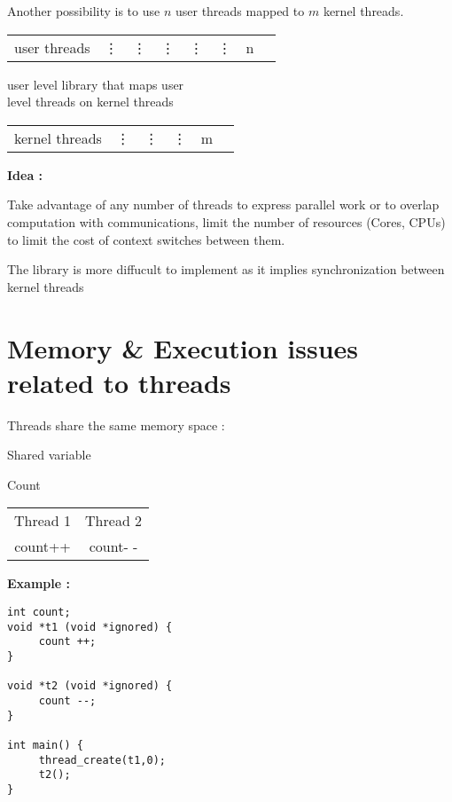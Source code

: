 \documentclass[a4paper,10pt]{article}
\begin{document}
Another possibility is to use $n$ user threads mapped to $m$ kernel threads.

\begin{tabular}{cccccccc}
	user threads & \vdots & \vdots & \vdots & \vdots & \vdots & n
\end{tabular}

\begin{flushright}
	user level library that maps user
	\\
	level threads on kernel threads
\end{flushright}

\begin{tabular}{cccccc}
	kernel threads & \vdots & \vdots & \vdots & m
\end{tabular}



\textbf{Idea :} 

Take advantage of any number of threads to express parallel work or to overlap computation with communications, limit the number of resources (Cores, CPUs) to limit the cost of context switches between them.

The library is more diffucult to implement as it implies synchronization between kernel threads

\section{Memory \& Execution issues related to threads}

Threads share the same memory space :
 
\begin{centering}
Shared variable

Count 

\begin{tabular}{c|c}
\hline
	Thread 1 & Thread 2\\

	count++ & count- -\\
\hline
\end{tabular}
 
\end{centering}

\textbf{Example :}

\begin{verbatim}
int count;
void *t1 (void *ignored) {
     count ++;
}

void *t2 (void *ignored) {
     count --;
}

int main() {
     thread_create(t1,0);
     t2();
}
	
\end{verbatim}
\end{document}
